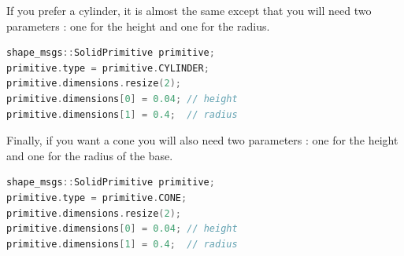 If you prefer a cylinder, it is almost the same except that you will need two parameters : one for the height and one for the radius.


\begin{lstlisting}[language=c++]
shape_msgs::SolidPrimitive primitive;
primitive.type = primitive.CYLINDER;
primitive.dimensions.resize(2);
primitive.dimensions[0] = 0.04; // height
primitive.dimensions[1] = 0.4;  // radius
\end{lstlisting}

Finally,  if you want a cone you will also need two parameters : one for the height and one for the radius of the base.

\begin{lstlisting}[language=c++]
shape_msgs::SolidPrimitive primitive;
primitive.type = primitive.CONE;
primitive.dimensions.resize(2);
primitive.dimensions[0] = 0.04; // height
primitive.dimensions[1] = 0.4;  // radius
\end{lstlisting}